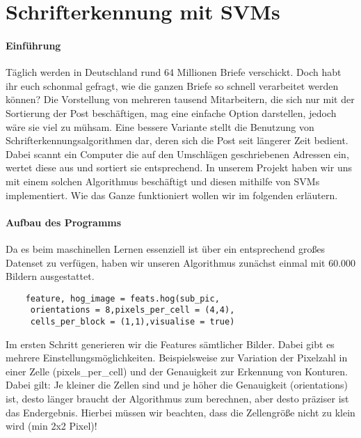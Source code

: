 \section{Schrifterkennung mit SVMs}

\paragraph{Einführung}
Täglich werden in Deutschland rund 64 Millionen Briefe verschickt. Doch habt ihr euch schonmal gefragt, wie die ganzen Briefe so schnell verarbeitet werden können? Die Vorstellung von mehreren tausend Mitarbeitern, die sich nur mit der Sortierung der Post beschäftigen, mag eine einfache Option darstellen, jedoch wäre sie viel zu mühsam. Eine bessere Variante stellt die Benutzung von Schrifterkennungsalgorithmen dar, deren sich die Post seit längerer Zeit bedient. Dabei scannt ein Computer die auf den Umschlägen geschriebenen Adressen ein, wertet diese aus und sortiert sie entsprechend. In unserem Projekt haben wir uns mit einem solchen Algorithmus beschäftigt und diesen mithilfe von SVMs implementiert. Wie das Ganze funktioniert wollen wir im folgenden erläutern.

\paragraph{Aufbau des Programms}

Da es beim maschinellen Lernen essenziell ist über ein entsprechend großes Datenset zu verfügen, haben wir unseren Algorithmus zunächst einmal mit 60.000 Bildern ausgestattet. 

\begin{verbatim}
	feature, hog_image = feats.hog(sub_pic,
	 orientations = 8,pixels_per_cell = (4,4),
	 cells_per_block = (1,1),visualise = true)
\end{verbatim}
Im ersten Schritt generieren wir die Features sämtlicher Bilder. Dabei gibt es mehrere Einstellungsmöglichkeiten. Beispielsweise zur Variation der Pixelzahl in einer Zelle (pixels_per_cell) und der Genauigkeit zur Erkennung von Konturen. Dabei gilt: Je kleiner die Zellen sind und je höher die Genauigkeit (orientations) ist, desto länger braucht der Algorithmus zum berechnen, aber desto präziser ist das Endergebnis. Hierbei müssen wir beachten, dass die Zellengröße nicht zu klein wird (min 2x2 Pixel)!

\begin{verbatim}

\end{verbatim}

